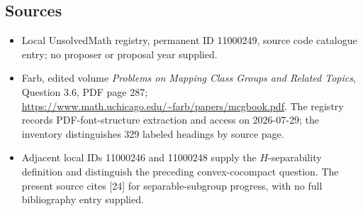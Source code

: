 \documentclass[11pt]{article}
\begin{document}
\subsection{Sources}
\begin{itemize}
\item Local UnsolvedMath registry, permanent ID 11000249, source code catalogue entry; no proposer or proposal year supplied.
\item Farb, edited volume \emph{Problems on Mapping Class Groups and Related Topics}, Question 3.6, PDF page 287; \url{https://www.math.uchicago.edu/~farb/papers/mcgbook.pdf}. The registry records PDF-font-structure extraction and access on 2026-07-29; the inventory distinguishes 329 labeled headings by source page.
\item Adjacent local IDs 11000246 and 11000248 supply the $H$-separability definition and distinguish the preceding convex-cocompact question. The present source cites [24] for separable-subgroup progress, with no full bibliography entry supplied.
\end{itemize}
\end{document}
